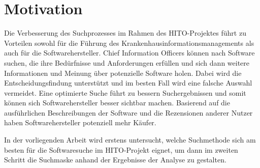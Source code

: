 
\section{Motivation}\label{sec:motivation}

Die Verbesserung des Suchprozesses im Rahmen des HITO-Projektes führt zu Vorteilen sowohl für die Führung des Krankenhausinformationsmanagements als auch für die Softwarehersteller. Chief Information Officers können nach Software suchen, die ihre Bedürfnisse und Anforderungen erfüllen und sich dann weitere Informationen und Meinung über potenzielle Software holen. Dabei wird die Entscheidungsfindung unterstützt und im besten Fall wird eine falsche Auswahl vermeidet. Eine optimierte Suche führt zu bessern Suchergebnissen und somit können sich Softwarehersteller besser sichtbar machen. Basierend auf die ausführlichen Beschreibungen der Software und die Rezensionen anderer Nutzer haben Softwarehersteller potenziell mehr Käufer.

In der vorliegenden Arbeit wird erstens untersucht, welche Suchmethode sich am besten für die Softwaresuche im HITO-Projekt eignet, um dann im zweiten Schritt die Suchmaske anhand der Ergebnisse der Analyse zu gestalten.



